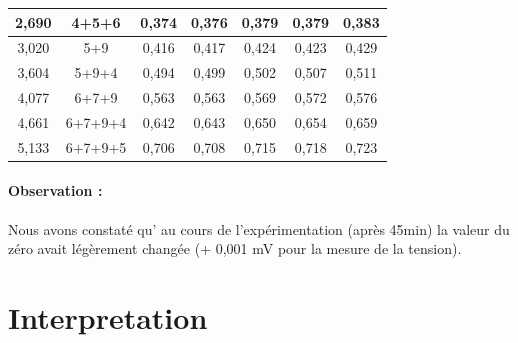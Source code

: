 \documentclass[11pt,a4paper]{report}
\begin{document}
\begin{center}
\begin{tabular}{|c|c|c|c|c|c|c|}
{\color[HTML]{963400} 2,690}                            & {\color[HTML]{963400} 4+5+6}                     & {\color[HTML]{00009B} 0,374}      & {\color[HTML]{00009B} 0,376}      & {\color[HTML]{00009B} 0,379}     & {\color[HTML]{00009B} 0,379}      & {\color[HTML]{00009B} 0,383}      \\ \hline
{\color[HTML]{963400} 3,020}                            & {\color[HTML]{963400} 5+9}                       & {\color[HTML]{00009B} 0,416}      & {\color[HTML]{00009B} 0,417}      & {\color[HTML]{00009B} 0,424}     & {\color[HTML]{00009B} 0,423}      & {\color[HTML]{00009B} 0,429}      \\ \hline
{\color[HTML]{963400} 3,604}                            & {\color[HTML]{963400} 5+9+4}                     & {\color[HTML]{00009B} 0,494}      & {\color[HTML]{00009B} 0,499}      & {\color[HTML]{00009B} 0,502}     & {\color[HTML]{00009B} 0,507}      & {\color[HTML]{00009B} 0,511}      \\ \hline
{\color[HTML]{963400} 4,077}                            & {\color[HTML]{963400} 6+7+9}                     & {\color[HTML]{00009B} 0,563}      & {\color[HTML]{00009B} 0,563}      & {\color[HTML]{00009B} 0,569}     & {\color[HTML]{00009B} 0,572}      & {\color[HTML]{00009B} 0,576}      \\ \hline
{\color[HTML]{963400} 4,661}                            & {\color[HTML]{963400} 6+7+9+4}                   & {\color[HTML]{00009B} 0,642}      & {\color[HTML]{00009B} 0,643}      & {\color[HTML]{00009B} 0,650}     & {\color[HTML]{00009B} 0,654}      & {\color[HTML]{00009B} 0,659}      \\ \hline
{\color[HTML]{963400} 5,133}                            & {\color[HTML]{963400} 6+7+9+5}                   & {\color[HTML]{00009B} 0,706}      & {\color[HTML]{00009B} 0,708}      & {\color[HTML]{00009B} 0,715}     & {\color[HTML]{00009B} 0,718}      & {\color[HTML]{00009B} 0,723}      \\ \hline

\end{tabular}
\end{center}
\paragraph{Observation :} Nous avons constaté qu' au cours de l'expérimentation (après 45min) la valeur du zéro avait légèrement changée (+  0,001 mV pour la mesure de la tension). 
\section*{Interpretation}	
\end{document}
